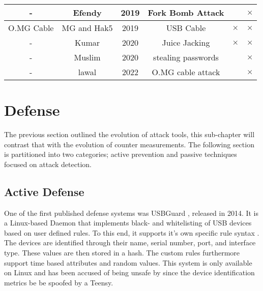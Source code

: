 {\begin{tabular}{|c c c c c c|}
 \hline
  - & Efendy\cite{efendyExploringPossibilityUSB2019} & 2019 & Fork Bomb Attack & & $\times$ \\
 \hline
 O.MG Cable & MG and Hak5  \cite{hak5MGCable} \cite{MGCable2019a} & 2019 & USB Cable & $\times$ & $\times$ \\
 \hline
- & Kumar \cite{kumarJuiceJackingUSB2020} & 2020 & Juice Jacking & $\times$ & $\times$ \\
\hline
- & Muslim \cite{muslimImplementationAnalysisUSB2020} & 2020 & stealing passwords & & $\times$ \\
\hline
-  & lawal \cite{lawalFacilitatingCyberenabledFraud2022} & 2022 & O.MG cable attack & & $\times$ \\
 \hline 
\end{tabular}
}%

\section{Defense} \label{HistoryOfDefense}

The previous section outlined the evolution of attack tools, this sub-chapter will contrast that with the evolution of counter measurements. 
The following section is partitioned into two categories; active prevention and passive techniques focused on attack detection.

\subsection{Active Defense}

One of the first published defense systems was USBGuard \cite{HomeUSBGuard}, released in 2014. It is a Linux-based Daemon that implements black- and whitelisting of USB devices based on user defined rules. To this end, it supports it's own specific rule syntax \cite{RuleLanguageUSBGuard}. The devices are identified through their name, serial number, port, and interface type. These values are then stored in a hash. The custom rules furthermore support time based attributes and random values. This system is only available on Linux and has been accused of being unsafe by \cite{farhiMalboardNovelUser2019} since the device identification metrics be be spoofed by a Teensy. 

